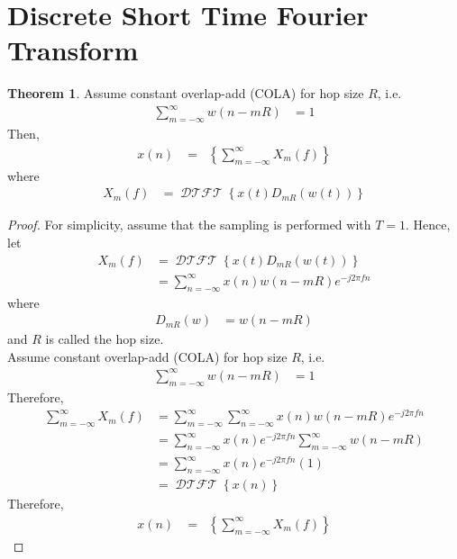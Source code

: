 \documentclass[titlepage, fleqn, a4paper, 12pt, twoside]{article}
\theoremstyle{definition}
\theoremstyle{theorem}
\newtheorem{theorem}{Theorem}
\DeclareMathOperator{\DTFT}{\mathcal{DTFT}}
\DeclareMathOperator{\IDTFT}{\mathcal{DTFT}^{-1}}
\begin{document}
\section{Discrete Short Time Fourier Transform}

\begin{theorem}
	Assume constant overlap-add (COLA) for hop size $R$, i.e.
	\begin{align*}
		\sum\limits_{m = -\infty}^{\infty} w(n - m R) &= 1
	\end{align*}
	Then,
	\begin{align*}
		x(n) &= \IDTFT\left\{ \sum\limits_{m = -\infty}^{\infty} X_m(f) \right\}
	\end{align*}
	where
	\begin{align*}
		X_m(f) &= \DTFT\left\{ x(t) D_{m R}\left( w(t) \right) \right\}
	\end{align*}
\end{theorem}

\begin{proof}
	For simplicity, assume that the sampling is performed with $T = 1$.
	Hence, let
	\begin{align*}
		X_m(f) &= \DTFT\left\{ x(t) D_{m R}\left( w(t) \right) \right\}\\
		&= \sum\limits_{n = -\infty}^{\infty} x(n) w(n - m R) e^{-j 2 \pi f n}
	\end{align*}
	where
	\begin{align*}
		D_{m R}(w) &= w(n - m R)
	\end{align*}
	and $R$ is called the hop size.\\
	Assume constant overlap-add (COLA) for hop size $R$, i.e.
	\begin{align*}
		\sum\limits_{m = -\infty}^{\infty} w(n - m R) &= 1
	\end{align*}
	Therefore,
	\begin{align*}
		\sum\limits_{m = -\infty}^{\infty} X_m(f) &= \sum\limits_{m = -\infty}^{\infty} \sum\limits_{n = -\infty}^{\infty} x(n) w(n - m R) e^{-j 2 \pi f n}\\
		&= \sum\limits_{n = -\infty}^{\infty} x(n) e^{-j 2 \pi f n} \sum\limits_{m = -\infty}^{\infty} w(n - m R)\\
		&= \sum\limits_{n = -\infty}^{\infty} x(n) e^{-j 2 \pi f n} (1)\\
		&= \DTFT\left\{ x(n) \right\}
	\end{align*}
	Therefore,
	\begin{align*}
		x(n) &= \IDTFT\left\{ \sum\limits_{m = -\infty}^{\infty} X_m(f) \right\}
	\end{align*}
\end{proof}
\end{document}
